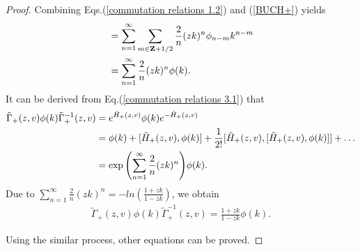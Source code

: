 \documentclass[11pt,reqno]{amsart}
\numberwithin{equation}{section}
\begin{document}
	\begin{proof}
		Combining Eqs.(\ref{commutation relations 1.2}) and (\ref{BUCH+}) yields
		\begin{align}
			[\tilde{H}_{+}(z,v),\phi(k)]
			&=\sum_{n=1}^{\infty}\sum_{m\in\mathbf{Z}+1/2}
			\frac{2}{n}(zk)^n  \phi_{n-m} k^{n-m}		\notag\\
			&= \sum_{n=1}^{\infty} \frac{2}{n}(zk)^n   \phi(k).
		\end{align}
		It can be derived	from Eq.(\ref{commutation relations 3.1}) that
		\begin{align}\label{UC-TD}
			\tilde{\Gamma}_+(z,v)\phi(k)\tilde{\Gamma}_+^{-1}(z,v)
			&=e^{\tilde{H}_{+}(z,v)}	\phi(k) e^{-\tilde{H}_{+}(z,v)}
			\notag\\	
			 &=\phi(k)+[\tilde{H}_{+}(z,v),\phi(k)]+\frac{1}{2!}[\tilde{H}_{+}(z,v),[\tilde{H}_{+}(z,v),\phi(k)]]+\ldots
			\notag\\	
			&=\exp{\left(\sum\limits_{n=1}^{\infty} \frac{2}{n}(zk)^n \right) }\phi(k).
		\end{align}
		Due to $\sum\limits_{n=1}^{\infty} \frac{2}{n}(zk)^n=-ln(\frac{1+zk}{1-zk})$, we obtain
		\begin{align}
			\tilde{\Gamma}_+(z,v)\phi(k)\tilde{\Gamma}_+^{-1}(z,v)
			=\frac{1+zk}{1-zk}	\phi(k).
		\end{align}
		
		Using the similar process, other equations can be proved.		
	\end{proof}
	
\end{document}
